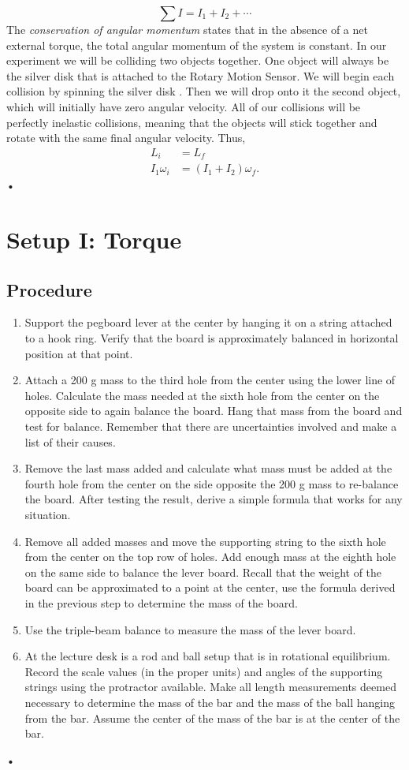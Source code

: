 \documentclass[main.tex]{subfiles}
\begin{document}
\[
\sum I=I_1+I_2+\dotsb
\]
The \emph{conservation of angular momentum} states that in the absence of a net external torque, the total angular momentum of the system is constant. In our experiment we will be colliding two objects together. One object will always be the silver disk that is attached to the Rotary Motion Sensor. We will begin each collision by spinning the silver disk . Then we will drop onto it the second object, which will initially have zero angular velocity. All of our collisions will be perfectly inelastic collisions, meaning that the objects will stick together and rotate with the same final angular velocity. Thus,
\begin{align}
L_i&=L_f \nonumber\\
I_1\omega_i &= (I_1+I_2)\omega_f. \label{eq:ConsAngMom}
\end{align}•

\section{Setup I: Torque}
\subsection*{Procedure}
\begin{enumerate}
\item
Support the pegboard lever at the center by hanging it on a string attached to a hook ring. Verify that the board is approximately balanced in horizontal position at that point.
\item
Attach a 200 g mass to the third hole from the center using the lower line of holes. Calculate the mass needed at the sixth hole from the center on the opposite side to again balance the board. Hang that mass from the board and test for balance. Remember that there are uncertainties involved and make a list of their causes.
\item
Remove the last mass added and calculate what mass must be added at the fourth hole from the center on the side opposite the 200 g mass to re-balance the board. After testing the result, derive a simple formula that works for any situation.
\item \label{step:LeverBoard_start}
Remove all added masses and move the supporting string to the sixth hole from the center on the top row of holes. Add enough mass at the eighth hole on the same side to balance the lever board. Recall that the weight of the board can be approximated to a point at the center, use the formula derived in the previous step to determine  the mass of the board.
\item \label{step:LeverBoard_end}
Use the triple-beam balance to measure the mass of the lever board.
\item
At the lecture desk is a rod and ball setup that is in rotational equilibrium. Record the scale values (in the proper units) and angles of the supporting strings using the protractor available. Make all length measurements deemed necessary to determine the mass of the bar and the mass of the ball hanging from the bar. Assume the center of the mass of the bar is at the center of the bar.
\end{enumerate}•
\end{document}
